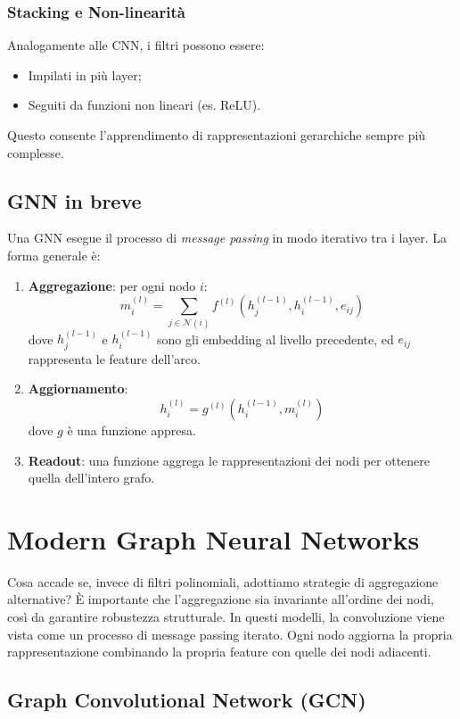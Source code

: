 \subsubsection{Stacking e Non-linearità}

Analogamente alle CNN, i filtri possono essere:
\begin{itemize}
  \item Impilati in più layer;
  \item Seguiti da funzioni non lineari (es. ReLU).
\end{itemize}
Questo consente l’apprendimento di rappresentazioni gerarchiche sempre più complesse.

\subsection{GNN in breve}

Una GNN esegue il processo di \textit{message passing} in modo iterativo tra i layer. La forma generale è:

\begin{enumerate}
    \item \textbf{Aggregazione}: per ogni nodo \( i \):
    \[
        m_i^{(l)} = \sum_{j\in \mathcal{N}(i)} f^{(l)}(h_j^{(l-1)}, h_i^{(l-1)}, e_{ij})
    \]
    dove \( h_j^{(l-1)} \) e \( h_i^{(l-1)} \) sono gli embedding al livello precedente, ed \( e_{ij} \) rappresenta le feature dell’arco.
    \item \textbf{Aggiornamento}:
    \[
        h_i^{(l)} = g^{(l)}(h_i^{(l-1)}, m_i^{(l)})
    \]
    dove \( g \) è una funzione appresa.
    \item \textbf{Readout}: una funzione aggrega le rappresentazioni dei nodi per ottenere quella dell’intero grafo.
\end{enumerate}

\section{Modern Graph Neural Networks}

Cosa accade se, invece di filtri polinomiali, adottiamo strategie di aggregazione alternative? È importante che l’aggregazione sia invariante all’ordine dei nodi, così da garantire robustezza strutturale. In questi modelli, la convoluzione viene vista come un processo di message passing iterato. Ogni nodo aggiorna la propria rappresentazione combinando la propria feature con quelle dei nodi adiacenti.

\subsection{Graph Convolutional Network (GCN)}

